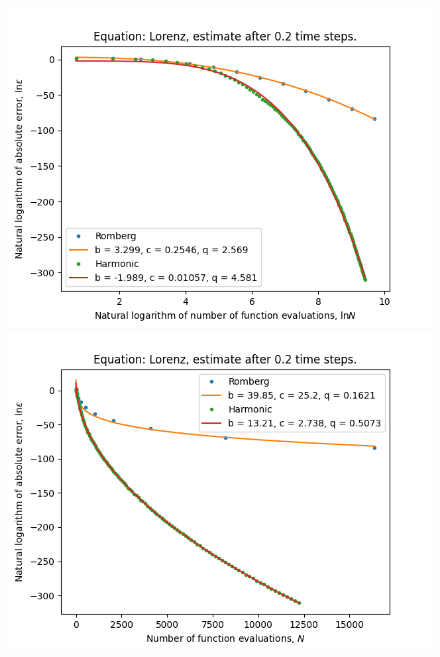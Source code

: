 \begin{figure}[H]
\centering
\begin{minipage}{0.45\textwidth}
\centering
\includegraphics[scale=0.45]{emr_plots/lorenz_02_hp_log_log_pow_fit_trend.png}
\end{minipage}
\begin{minipage}{0.45\textwidth}
\centering
\includegraphics[scale=0.45]{emr_plots/lorenz_02_hp_trend.png}
\end{minipage}
\end{figure}

